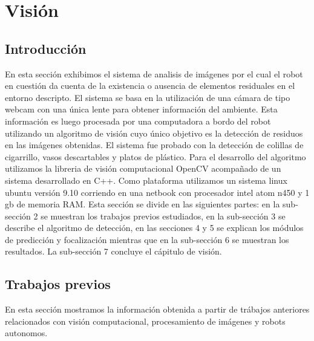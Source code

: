 ﻿\section{Visión}

\subsection{Introducción}
En esta sección exhibimos el sistema de analisis de imágenes por 
el cual el robot en cuestión da cuenta de la existencia o ausencia de 
elementos residuales en el entorno descripto. El sistema se basa en la 
utilización de una cámara de tipo webcam con una única lente para 
obtener información del ambiente. Esta información es luego procesada 
por una computadora a bordo del robot utilizando un algoritmo de visión 
cuyo único objetivo es la detección de residuos 
en las imágenes obtenidas. El sistema fue probado con la detección de 
colillas de cigarrillo, vasos descartables y platos de plástico. Para 
el desarrollo del algoritmo utilizamos la libreria de visión 
computacional OpenCV \cite{opencv_library} acompañado de un sistema 
desarrollado en C++. Como plataforma utilizamos un sistema linux 
ubuntu versión 9.10 corriendo en una netbook con procesador intel atom 
n450 y 1 gb de memoria RAM.
Esta sección se divide en las siguientes partes: en la sub-sección 2 se 
muestran los trabajos previos estudiados, en la sub-sección 3 se 
describe el algoritmo de detección, en las secciones 4 y 5 se explican 
los módulos de predicción y focalización mientras que en la 
sub-sección 6 se muestran los resultados. La sub-sección 7 concluye 
el cápitulo de visión.

\subsection{Trabajos previos}
En esta sección mostramos la información obtenida a partir de 
trábajos anteriores relacionados con visión computacional, 
procesamiento de imágenes y robots autonomos.
 
